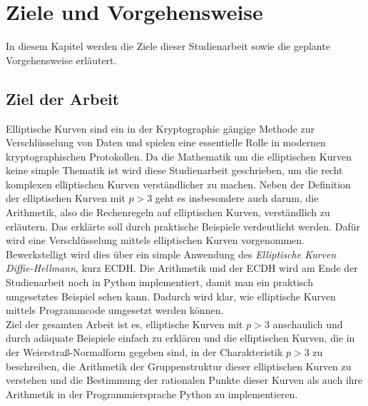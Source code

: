 \chapter{Ziele und Vorgehensweise}
In diesem Kapitel werden die Ziele dieser Studienarbeit sowie die geplante Vorgehensweise erläutert.

\section{Ziel der Arbeit}
Elliptische Kurven sind ein in der Kryptographie gängige Methode zur Verschlüsselung von Daten und spielen eine essentielle Rolle in modernen kryptographischen Protokollen. Da die Mathematik um die elliptischen Kurven keine simple Thematik ist wird diese Studienarbeit geschrieben, um die recht komplexen elliptischen Kurven verständlicher zu machen. Neben der Definition der elliptischen Kurven mit $p > 3$ geht es insbesondere auch darum, die Arithmetik, also die Rechenregeln auf elliptischen Kurven, verständlich zu erläutern. Das erklärte soll durch praktische Beispiele verdeutlicht werden. Dafür wird eine Verschlüsselung mittels elliptischen Kurven vorgenommen. Bewerkstelligt wird dies über ein simple Anwendung des \textit{Elliptische Kurven Diffie-Hellmann}, kurz ECDH. Die Arithmetik und der ECDH wird am Ende der Studienarbeit noch in Python implementiert, damit man ein praktisch umgesetztes Beispiel sehen kann. Dadurch wird klar, wie elliptische Kurven mittels Programmcode umgesetzt werden können.\\

Ziel der gesamten Arbeit ist es, elliptische Kurven mit $p > 3$ anschaulich und durch adäquate Beispiele einfach zu erklären und die elliptischen Kurven, die in der Weierstraß-Normalform gegeben sind, in der Charakteristik $p > 3$ zu beschreiben, die Arithmetik der Gruppenstruktur dieser elliptischen Kurven zu verstehen und die Bestimmung der rationalen Punkte dieser Kurven als auch ihre Arithmetik in der Programmiersprache Python zu implementieren.

